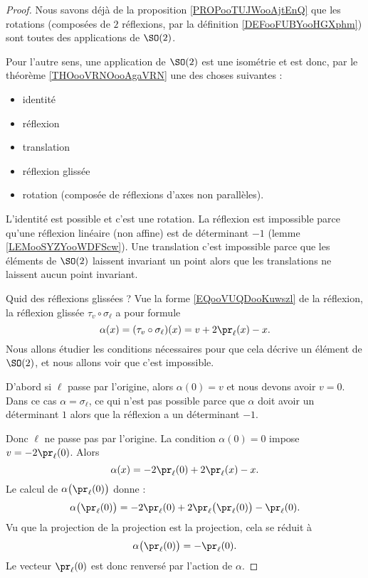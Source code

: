 \begin{proof}
    Nous savons déjà de la proposition \ref{PROPooTUJWooAjtEnQ} que les rotations (composées de \( 2\) réflexions, par la définition \ref{DEFooFUBYooHGXphm}) sont toutes des applications de \( \SO(2)\).

    Pour l'autre sens, une application de \( \SO(2)\) est une isométrie et est donc, par le théorème \ref{THOooVRNOooAgaVRN} une des choses suivantes : 
    \begin{itemize}
        \item identité
        \item réflexion
        \item translation
        \item réflexion glissée
        \item rotation (composée de réflexions d'axes non parallèles).
    \end{itemize}
    L'identité est possible et c'est une rotation. La réflexion est impossible parce qu'une réflexion linéaire (non affine) est de déterminant \( -1\) (lemme \ref{LEMooSYZYooWDFScw}). Une translation c'est impossible parce que les éléments de \( \SO(2)\) laissent invariant un point alors que les translations ne laissent aucun point invariant.

    Quid des réflexions glissées ? Vue la forme \eqref{EQooVUQDooKuwszl} de la réflexion, la réflexion glissée \( \tau_v\circ \sigma_{\ell}\) a pour formule
    \begin{equation}
        \alpha(x)=(\tau_v\circ\sigma_{\ell})(x)=v+2\pr_{\ell}(x)-x.    
    \end{equation}
    Nous allons étudier les conditions nécessaires pour que cela décrive un élément de \( \SO(2)\), et nous allons voir que c'est impossible.

    D'abord si \( \ell\) passe par l'origine, alors \( \alpha(0)=v\) et nous devons avoir \( v=0\). Dans ce cas \( \alpha=\sigma_{\ell}\), ce qui n'est pas possible parce que \( \alpha\) doit avoir un déterminant \( 1\) alors que la réflexion a un déterminant \( -1\).

    Donc \( \ell\) ne passe pas par l'origine. La condition \( \alpha(0)=0\) impose \( v=-2\pr_{\ell}(0)\). Alors
    \begin{equation}
        \alpha(x)=-2\pr_{\ell}(0)+2\pr_{\ell}(x)-x.
    \end{equation}
    Le calcul de \( \alpha\big( \pr_{\ell}(0) \big)\) donne :
    \begin{equation}
        \alpha\big( \pr_{\ell}(0) \big)=-2\pr_{\ell}(0)+2\pr_{\ell}\big( \pr_{\ell}(0) \big)-\pr_{\ell}(0).
    \end{equation}
    Vu que la projection de la projection est la projection, cela se réduit à
    \begin{equation}
        \alpha\big( \pr_{\ell}(0) \big)=-\pr_{\ell}(0).
    \end{equation}
    Le vecteur \( \pr_{\ell}(0)\) est donc renversé par l'action de \( \alpha\).


\end{proof}
